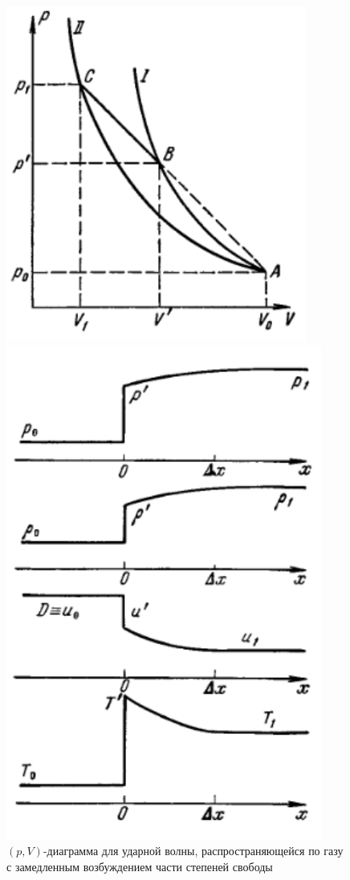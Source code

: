 \documentclass[10pt, a4paper]{article}
\begin{document}
\begin{figure}[ht]
\begin{center}
\begin{minipage}[ht]{0.32\linewidth}
			\includegraphics[height=0.2\textheight]{shock_wave_pV}
			\caption{$(p, V)$-диаграмма для ударной волны, распространяющейся по газу с замедленным возбуждением части степеней свободы~\cite{zeldovich}}
			\label{fig:shock_wave_pV} 
		\end{minipage}
		\hfill
		\begin{minipage}[ht]{0.32\linewidth}
			\includegraphics[height=0.2\textheight]{shock_wave_profiles}

\end{minipage}
\end{center}
\end{figure}
\end{document}
